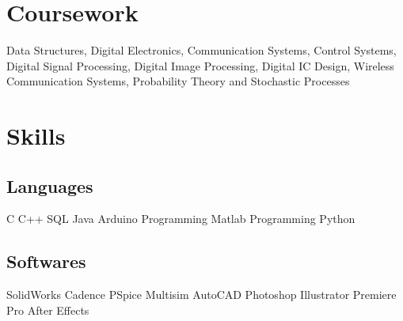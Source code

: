 \documentclass[]{deedy-resume-openfont}
\begin{document}
%
%
\lastupdated

%
%



%
%

\begin{minipage}[t]{0.33\textwidth} 





\section{Coursework}

 Data Structures, Digital Electronics, Communication Systems,  Control Systems, Digital Signal Processing, Digital Image Processing, Digital IC Design, Wireless Communication Systems, Probability Theory and Stochastic Processes



\section{Skills}
\subsection{Languages}
C \textbullet{} C++ \textbullet{} SQL \textbullet{} Java  \textbullet{} Arduino Programming \textbullet{} Matlab Programming \textbullet{} Python 
\subsection{Softwares}
SolidWorks \textbullet{} Cadence \textbullet{} PSpice \textbullet{} Multisim \textbullet{} AutoCAD \textbullet{}  Photoshop \textbullet{} Illustrator \textbullet{} Premiere Pro \textbullet{} After Effects 


\end{minipage}
\end{document}
